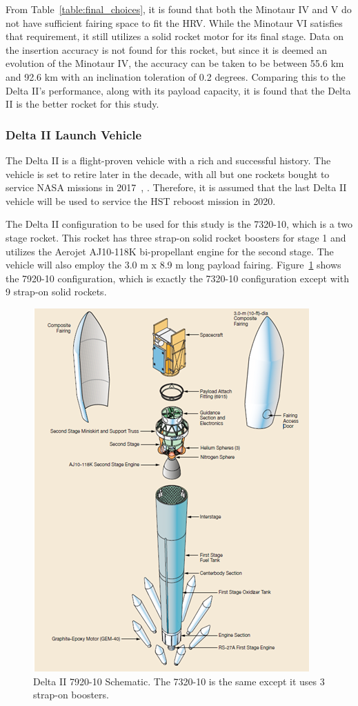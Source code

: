 \documentclass[paper=letter, fontsize=11pt]{scrartcl} %
\numberwithin{equation}{section} %
\numberwithin{figure}{section} %
\numberwithin{table}{section} %
\begin{document}
From Table~\ref{table:final_choices}, it is found that both the Minotaur IV and V do not have sufficient fairing space to fit the HRV. While the Minotaur VI satisfies that requirement, it still utilizes a solid rocket motor for its final stage. Data on the insertion accuracy is not found for this rocket, but since it is deemed an evolution of the Minotaur IV, the accuracy can be taken to be between 55.6 km and 92.6 km with an inclination toleration of 0.2 degrees. Comparing this to the Delta II's performance, along with its payload capacity, it is found that the Delta II is the better rocket for this study.

\subsubsection{Delta II Launch Vehicle}
The Delta II is a flight-proven vehicle with a rich and successful history. The vehicle is set to retire later in the decade, with all but one rockets bought to service NASA missions in 2017~\cite{ref12_11}, \cite{ref12_12}. Therefore, it is assumed that the last Delta II vehicle will be used to service the HST reboost mission in 2020.

The Delta II configuration to be used for this study is the 7320-10, which is a two stage rocket. This rocket has three strap-on solid rocket boosters for stage 1 and utilizes the Aerojet AJ10-118K bi-propellant engine for the second stage. The vehicle will also employ the 3.0 m x 8.9 m long payload fairing. Figure~\ref{L1} shows the 7920-10 configuration, which is exactly the 7320-10 configuration except with 9 strap-on solid rockets.

\begin{figure}[H]
\centering
\includegraphics[width=.75\textwidth]{12-1.png}
\caption{Delta II 7920-10 Schematic. The 7320-10 is the same except it uses 3 strap-on boosters.~\cite{ref12_13}}
\label{L1}
\end{figure}
\end{document}
